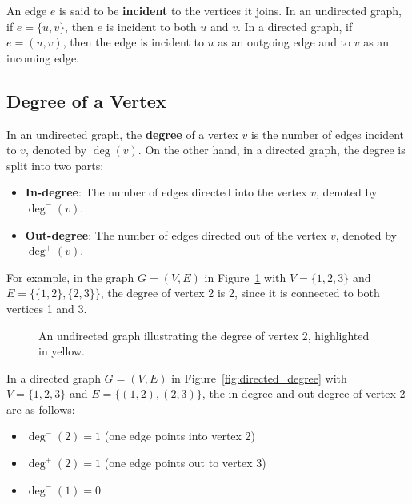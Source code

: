 An edge \( e \) is said to be \textbf{incident} to the vertices it joins. In an undirected graph, if \( e = \{u, v\} \), then \( e \) is incident to both \( u \) and \( v \). In a directed graph, if \( e = (u, v) \), then the edge is incident to \( u \) as an outgoing edge and to \( v \) as an incoming edge.  \cite{yadav2023advanced, cormen2009introduction}

\subsection{Degree of a Vertex}
\vspace{0.05cm}
In an undirected graph, the \textbf{degree} of a vertex \( v \) is the number of edges incident to \( v \), denoted by \( \deg(v) \). \cite{yadav2023advanced, cormen2009introduction} On the other hand, in a directed graph, the degree is split into two parts:
\begin{itemize}
    \item \textbf{In-degree}: The number of edges directed into the vertex \( v \), denoted by \( \deg^-(v) \).
    \item \textbf{Out-degree}: The number of edges directed out of the vertex \( v \), denoted by \( \deg^+(v) \).
\end{itemize}

For example, in the graph \( G = (V, E) \) in Figure~\ref{fig:degree} with \( V = \{1, 2, 3\} \) and \( E = \{\{1, 2\}, \{2, 3\}\} \), the degree of vertex 2 is 2, since it is connected to both vertices 1 and 3.

\begin{figure}[h]
\begin{center}
\caption{An undirected graph illustrating the degree of vertex 2, highlighted in yellow.}
\label{fig:degree}
\end{center}
\end{figure}

In a directed graph \( G = (V, E) \) in Figure~\ref{fig:directed_degree} with \( V = \{1, 2, 3\} \) and \( E = \{(1, 2), (2, 3)\} \), the in-degree and out-degree of vertex 2 are as follows:
\begin{itemize}
    \item \(\deg^-(2) = 1\) (one edge points into vertex 2)
    \item \(\deg^+(2) = 1\) (one edge points out to vertex 3)
    \item \(\deg^-(1) = 0\)
\end{itemize}


